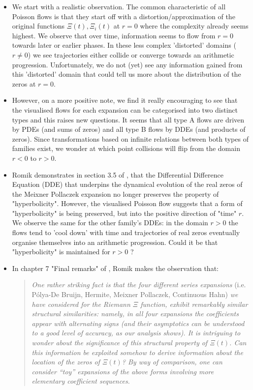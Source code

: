 \documentclass[a4paper,11pt,twoside]{amsart}
\begin{document}
\begin{itemize}
  \item We start with a realistic observation. The common characteristic of all Poisson flows is that they start off with a distortion/approximation of the original functions $\Xi(t), \Xi_i(t)$ at $r=0$ where the complexity already seems highest. We observe that over time, information seems to flow from $r=0$ towards later or earlier phases. In these less complex 'distorted' domains ($r \ne 0$) we see trajectories either collide or converge towards an arithmetic progression. Unfortunately, we do not (yet) see any information gained from this 'distorted' domain that could tell us more about the distribution of the zeros at $r=0$. 
\item However, on a more positive note, we find it really encouraging to see that the visualised flows for each expansion can be categorised into two distinct types and this raises new questions. It seems that all type A flows are driven by PDEs (and sums of zeros) and all type B flows by DDEs (and products of zeros). Since transformations based on infinite relations between both types of families exist, we wonder at which point collisions will flip from the domain $r < 0$ to $r > 0$. 
\item Romik demonstrates in section 3.5 of \cite{rom}, that the Differential Difference Equation (DDE) that underpins the dynamical evolution of the real zeros of the Meixner Pollaczek expansion no longer preserves the property of "hyperbolicity". However, the visualised Poisson flow suggests that a form of "hyperbolicity" is being preserved, but into the positive direction of "time" $r$. We observe the same for the other family's DDEs: in the domain $r > 0$ the flows tend to 'cool down' with time and trajectories of real zeros eventually organise themselves into an arithmetic progression. Could it be that "hyperbolicity" is maintained for $r > 0$ ? 
\item In chapter 7 "Final remarks" of \cite{rom}, Romik makes the observation that:
\begin{quotation}
\textit{One rather striking fact is that the four different series expansions} (i.e. Pólya-De Bruijn, Hermite, Meixner Pollaczek, Continuous Hahn) \textit{we have considered for the Riemann $\Xi$ function, exhibit remarkably similar structural similarities: namely, in all four expansions the coefficients appear with alternating signs (and their asymptotics can be understood to a good level of accuracy, as our analysis shows). It is intriguing to wonder about the significance of this structural property of $\Xi(t)$. Can this information be exploited somehow to derive information about the location of the zeros of $\Xi(t)$? By way of comparison, one can consider “toy” expansions of the above forms involving more elementary coefficient sequences.}
\end{quotation}


\end{itemize}
\end{document}
